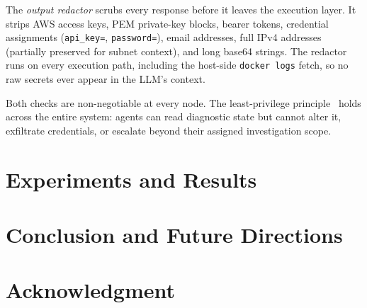 \documentclass[conference]{IEEEtran}
\begin{document}
The \textit{output redactor} scrubs every response before it leaves
the execution layer. It strips AWS access keys, PEM private-key
blocks, bearer tokens, credential assignments
(\texttt{api\_key=}, \texttt{password=}), email addresses, full IPv4
addresses (partially preserved for subnet context), and long base64
strings. The redactor runs on every execution path, including the
host-side \texttt{docker logs} fetch, so no raw secrets ever appear
in the LLM's context.

Both checks are non-negotiable at every node. The least-privilege
principle~\cite{kholkar2025safeops} holds across the entire system:
agents can read diagnostic state but cannot alter it, exfiltrate
credentials, or escalate beyond their assigned investigation scope.


\section{Experiments and Results}


\section{Conclusion and Future Directions}




\section*{Acknowledgment}




  
\end{document}

